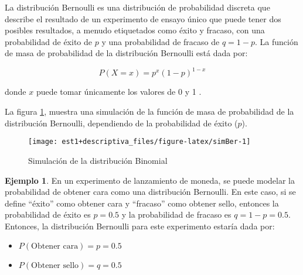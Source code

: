 \documentclass[
]{book}
\providecommand{\tightlist}{%
  \setlength{\itemsep}{0pt}\setlength{\parskip}{0pt}}
\theoremstyle{definition}
\theoremstyle{definition}
\newtheorem{example}{Ejemplo}[chapter]
\theoremstyle{definition}
\theoremstyle{definition}
\theoremstyle{remark}
\begin{document}
La distribución Bernoulli es una distribución de probabilidad discreta que describe el resultado de un experimento de ensayo único que puede tener dos posibles resultados, a menudo etiquetados como éxito y fracaso, con una probabilidad de éxito de \(p\) y una probabilidad de fracaso de \(q = 1 - p\). La función de masa de probabilidad de la distribución Bernoulli está dada por:

\begin{equation}
P(X = x) = p^x(1-p)^{1-x}
\label{eq:bernoulli}
\end{equation}

donde \(x\) puede tomar únicamente los valores de 0 y 1 \citep[página 105]{larsen}.

La figura \ref{fig:simBer}, muestra una simulación de la función de masa de probabilidad de la distribución Bernoulli, dependiendo de la probabilidad de éxito (\(p\)).

\begin{figure}

{\centering \texttt{[image: est1+descriptiva\_files/figure-latex/simBer-1]} 

}

\caption{Simulación de la distribución Binomial}\label{fig:simBer}
\end{figure}

\begin{example}

En un experimento de lanzamiento de moneda, se puede modelar la probabilidad de obtener cara como una distribución Bernoulli. En este caso, si se define ``éxito'' como obtener cara y ``fracaso'' como obtener sello, entonces la probabilidad de éxito es \(p = 0.5\) y la probabilidad de fracaso es \(q = 1 - p = 0.5\). Entonces, la distribución Bernoulli para este experimento estaría dada por:

\begin{itemize}
\tightlist
\item
  \(P(\text{Obtener cara}) = p = 0.5\)
\item
  \(P(\text{Obtener sello}) = q = 0.5\)
\end{itemize}

\end{example}
\end{document}
